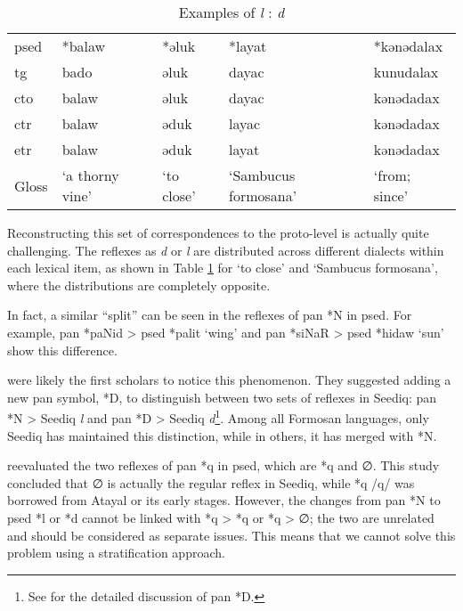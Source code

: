 \begin{table}[!htbp]
\centering
\caption{Examples of \textit{l} : \textit{d}}
\label{tab:irr_ld}
\begin{tabular}{lllll}
\hline
\acs{psed} & *balaw        & *əluk    & *layat             & *kənədalax    \\ \hdashline
\acs{tg}   & bado            & əluk       & dayac                & kunudalax     \\
\acs{cto}  & balaw           & əluk       & dayac                & kənədadax     \\
\acs{ctr}  & balaw           & əduk       & layac                & kənədadax     \\
\acs{etr}  & balaw           & əduk       & layat                & kənədadax     \\ \hline
Gloss      & `a thorny vine' & `to close' & `Sambucus formosana' & `from; since' \\ \hline
\end{tabular}
\end{table}

Reconstructing this set of correspondences to the proto-level is actually quite challenging. The reflexes as \textit{d} or \textit{l} are distributed across different dialects within each lexical item, as shown in Table \ref{tab:irr_ld} for `to close' and `Sambucus formosana', where the distributions are completely opposite. 

In fact, a similar ``split'' can be seen in the reflexes of \acl{pan} *N in \acl{psed}. For example, \acs{pan} *paNid > \acs{psed} *palit `wing' and \acs{pan} *siNaR > \acs{psed} *hidaw `sun' show this difference.

\textcite{dyen1987d5} were likely the first scholars to notice this phenomenon. They suggested adding a new \acs{pan} symbol, *D, to distinguish between two sets of reflexes in Seediq: \acs{pan} *N > Seediq \textit{l} and \acs{pan} *D > Seediq \textit{d}\footnote{See \textcite{tsuchida1976tsouic} for the detailed discussion of \acs{pan} *D. }. Among all Formosan languages, only Seediq has maintained this distinction, while in others, it has merged with *N.

\textcite{song2024sedq} reevaluated the two reflexes of \acl{pan} *q in \acl{psed}, which are *q and ∅. This study concluded that ∅ is actually the regular reflex in Seediq, while *q /q/ was borrowed from Atayal or its early stages. However, the changes from \ac{pan} *N to \ac{psed} *l or *d cannot be linked with *q > *q or *q > ∅; the two are unrelated and should be considered as separate issues. This means that we cannot solve this problem using a stratification approach.

